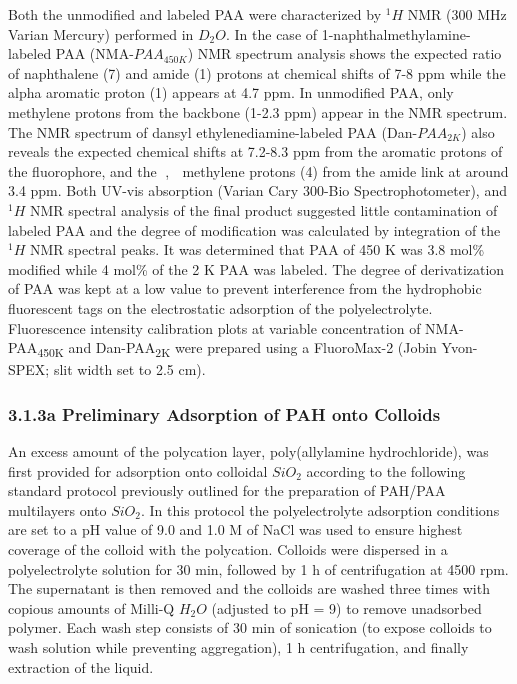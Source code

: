 \documentclass[journal=mamobx,manuscript=article]{achemso}
\begin{document}
Both the unmodified and labeled PAA were characterized by $^{1}H$ NMR (300 MHz Varian Mercury) performed in $D_2O$.  In the case of 1-naphthalmethylamine-labeled PAA (NMA-$PAA_{450K}$) NMR spectrum analysis shows the expected ratio of naphthalene (7) and amide (1) protons at chemical shifts of 7-8 ppm while the alpha aromatic proton (1) appears at 4.7 ppm.  In unmodified PAA, only methylene protons from the backbone (1-2.3 ppm) appear in the NMR spectrum.  The NMR spectrum of dansyl ethylenediamine-labeled PAA (Dan-$PAA_{2K}$) also reveals the expected chemical shifts at 7.2-8.3 ppm from the aromatic protons of the fluorophore, and the ,  methylene protons (4) from the amide link at around 3.4 ppm.  Both UV-vis absorption (Varian Cary 300-Bio Spectrophotometer), and $^{1}H$ NMR spectral analysis of the final product suggested little contamination of labeled PAA and the degree of modification was calculated by integration of the $^{1}H$ NMR spectral peaks.  It was determined that PAA of 450 K was 3.8 mol\% modified while 4 mol\% of the 2 K PAA was labeled.  The degree of derivatization of PAA was kept at a low value to prevent interference from the hydrophobic fluorescent tags on the electrostatic adsorption of the polyelectrolyte.  Fluorescence intensity calibration plots at variable concentration of NMA-PAA\textsubscript{450K} and Dan-PAA\textsubscript{2K} were prepared using a FluoroMax-2 (Jobin Yvon-SPEX; slit width set to 2.5 cm). 

\subsubsection{3.1.3a Preliminary Adsorption of PAH onto Colloids}

An excess amount of the polycation layer, poly(allylamine hydrochloride), was first provided for adsorption onto colloidal $SiO_2$ according to the following standard protocol previously outlined for the preparation of PAH/PAA multilayers onto $SiO_2$.\cite{Burke2003}  In this protocol the polyelectrolyte adsorption conditions are set to a pH value of 9.0 and 1.0 M of NaCl was used to ensure highest coverage of the colloid with the polycation.  Colloids were dispersed in a polyelectrolyte solution for 30 min, followed by 1 h of centrifugation at 4500 rpm.  The supernatant is then removed and the colloids are washed three times with copious amounts of Milli-Q $H_2O$ (adjusted to pH = 9) to remove unadsorbed polymer.  Each wash step consists of 30 min of sonication (to expose colloids to wash solution while preventing aggregation), 1 h centrifugation, and finally extraction of the liquid.  
\end{document}
